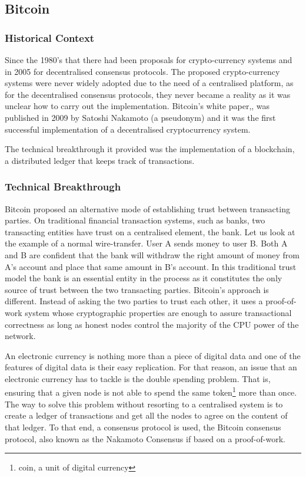 \documentclass[llncsdoc]{llncs}
\begin{document}
\subsection{Bitcoin}

\subsubsection{Historical Context}

 Since the 1980's that there had been proposals for crypto-currency systems and in 2005 for decentralised consensus protocols. The proposed crypto-currency systems were never widely adopted due to the need of a centralised platform, as for the decentralised consensus protocols, they never became a reality as it was unclear how to carry out the implementation.
 Bitcoin's white paper,\cite{Anonymous:JOJGrvgg}, was published in 2009 by Satoshi Nakamoto (a pseudonym) and it was the first successful implementation of a decentralised cryptocurrency system.
 
 The technical breakthrough it provided was the implementation of a blockchain, a distributed ledger that keeps track of transactions. 
 \subsubsection{Technical Breakthrough}
 Bitcoin proposed an alternative mode of establishing trust between transacting parties. On traditional financial transaction systems, such as banks, two transacting entities have trust on a centralised element, the bank. Let us look at the example of a normal wire-transfer. User A sends money to user B. Both A and B are confident that the bank will withdraw the right amount of money from A's account and place that same amount in B's account. In this traditional trust model the bank is an essential entity in the process as it constitutes the only source of trust between the two transacting parties. Bitcoin's approach is different. Instead of asking the two parties to trust each other, it uses a proof-of-work system whose cryptographic properties are enough to assure transactional correctness as long as honest nodes control the majority of the CPU power of the network.
 
 An electronic currency is nothing more than a piece of digital data and one of the features of digital data is their easy replication. For that reason, an issue that an electronic currency has to tackle is the double spending problem. That is, ensuring that a given node is not able to spend the same token\footnote{coin, a unit of digital currency} more than once. The way to solve this problem without resorting to a centralised system is to create a ledger of transactions and get all the nodes to agree on the content of that ledger. 
 To that end, a consensus protocol is used, the Bitcoin consensus protocol, also known as the Nakamoto Consensus if based on a proof-of-work.
 
\end{document}
